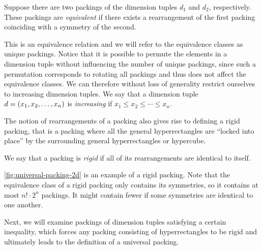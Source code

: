 \begin{definition}
Suppose there are two packings of the dimension tuples $d_1$ and $d_2$, respectively. These packings are \textit{equivalent} if there exists a rearrangement of the first packing coinciding with a symmetry of the second.
\end{definition}

\noindent This is an equivalence relation and we will refer to the equivalence classes as unique packings. Notice that it is possible to permute the elements in a dimension tuple without influencing the number of unique packings, since such a permutation corresponds to rotating all packings and thus does not affect the equivalence classes. We can therefore without loss of generality restrict ourselves to increasing dimension tuples. We say that a dimension tuple $d = \left( x_1, x_2, \dotsc, x_n \right)$ is \textit{increasing} if $x_1 \leq x_2 \leq \dotsb \leq x_n$.

The notion of rearrangements of a packing also gives rise to defining a rigid packing, that is a packing where all the general hyperrectangles are ``locked into place'' by the surrounding general hyperrectangles or hypercube.

\begin{definition}
We say that a packing is \textit{rigid} if all of its rearrangements are identical to itself.
\end{definition}

\noindent \cref{fig:universal-packing-2d} is an example of a rigid packing. Note that the equivalence class of a rigid packing only contains its symmetries, so it contains at most $n! \cdot 2^n$ packings. It might contain fewer if some symmetries are identical to one another.

Next, we will examine packings of dimension tuples satisfying a certain inequality, which forces any packing consisting of hyperrectangles to be rigid and ultimately leads to the definition of a universal packing.

